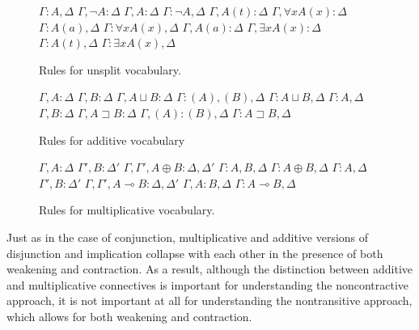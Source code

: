 \documentclass{ergoclass}
\def\fCenter{:}
\newcommand{\mcond}{\ensuremath{\multimap}}
\newcommand{\mor}{\ensuremath{\oplus}}
\newcommand{\acond}{\ensuremath{\sqsupset}}
\newcommand{\aor}{\ensuremath{\sqcup}}
\newcommand{\D}{\Delta}
\newcommand{\G}{\Gamma}
\newcommand{\hs}{\hskip 5mm}
\newcommand{\vs}{\vskip 5mm}
\newcommand{\BIx}[2]{\BinaryInf$ #1 \fCenter #2$}
\newcommand{\UIx}[2]{\UnaryInf$ #1 \fCenter #2$}
\newcommand{\AXx}[2]{\Axiom$ #1 \fCenter #2$}
\newcommand{\LLl}[1]{\LeftLabel{\scriptsize #1:\quad}}
\begin{document}
\begin{figure}


\begin{center}
\AXx{\G}{A, \D}
\LLl{$\neg$L}
\UIx{\G, \neg A}{\D}
\DP
\hs
\AXx{\G, A}{\D}
\LLl{$\neg$R}
\UIx{\G}{\neg A, \D}
\DP
\vs
\AXx{\G, A(t)}{\D}
\LLl{$\forall$L}
\UIx{\G, \forall x A(x)}{\D}
\DP
\hs
\AXx{\G}{A(a), \D}
\LLl{$\forall$R}
\UIx{\G}{\forall x A(x), \D}
\DP
\vs
\AXx{\G, A(a)}{\D}
\LLl{$\exists$L}
\UIx{\G, \exists x A(x)}{\D}
\DP
\hs
\AXx{\G}{A(t), \D}
\LLl{$\exists$R}
\UIx{\G}{\exists x A(x), \D}
\DP

\end{center}

\caption{Rules for unsplit vocabulary.}
\label{unsplitrules}
\end{figure}


\begin{figure}


\begin{center}
\AXx{\G, A}{\D}
\AXx{\G, B}{\D}
\LLl{$\aor$L}
\BIx{\G, A \aor B}{\D}
\DP
\hs
\AXx{\G}{(A), (B), \D}
\LLl{$\aor$R}
\UIx{\G}{A \aor B, \D}
\DP
\vs
\AXx{\G}{A, \D}
\AXx{\G, B}{\D}
\LLl{$\acond$L}
\BIx{\G, A \acond B}{\D}
\DP
\hs
\AXx{\G, (A)}{(B), \D}
\LLl{$\acond$R}
\UIx{\G}{A \acond B, \D}
\DP
\end{center}



\caption{Rules for additive vocabulary}
\label{addrules}
\end{figure}

\begin{figure}



\begin{center}
\AXx{\G, A}{\D}
\AXx{\G', B}{\D'}
\LLl{$\mor$L}
\BIx{\G, \G', A \mor B}{\D, \D'}
\DP
\hs
\AXx{\G}{A, B, \D}
\LLl{$\mor$R}
\UIx{\G}{A \mor B, \D}
\DP
\vs
\AXx{\G}{A, \D}
\AXx{\G', B}{\D'}
\LLl{$\mcond$L}
\BIx{\G, \G', A \mcond B}{\D, \D'}
\DP
\hs
\AXx{\G, A}{B, \D}
\LLl{$\mcond$R}
\UIx{\G}{A \mcond B, \D}
\DP
\end{center}

\caption{Rules for multiplicative vocabulary.}
\label{multrules}
\end{figure}

Just as in the case of conjunction, multiplicative and additive versions of disjunction and implication collapse with each other in the presence of both weakening and contraction. As a result, although the distinction between additive and multiplicative connectives is important for understanding the noncontractive approach, it is not important at all for understanding the nontransitive approach, which allows for both weakening and contraction.
\end{document}
